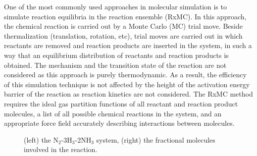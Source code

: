 One of the most commonly used approaches in molecular simulation is to simulate
reaction equilibria in the reaction ensemble (RxMC). In this approach, the chemical reaction is 
carried out by a Monte Carlo (MC) trial move. Beside thermalization (translation, rotation, etc), 
trial moves are carried out in which reactants are removed and reaction products are inserted 
in the system, in such a way that an equilibrium distribution of reactants and reaction products 
is obtained. The mechanism and the transition state of the reaction are not considered as 
this approach is purely thermodynamic. As a result, the efficiency of this simulation technique 
is not affected by the height of the activation energy barrier of the reaction as reaction kinetics 
are not considered. The RxMC method
requires the ideal gas partition functions of all reactant and reaction product molecules, 
a list of all possible chemical reactions in the system, and an appropriate force field 
accurately describing interactions between molecules.

\begin{figure}[t]
  \centering
  \caption{(left) the N$_2$-3H$_3$-2NH$_3$ system, (right) the fractional molecules involved in the reaction.}
  \label{Tutorial-reaction-system}
\end{figure}

